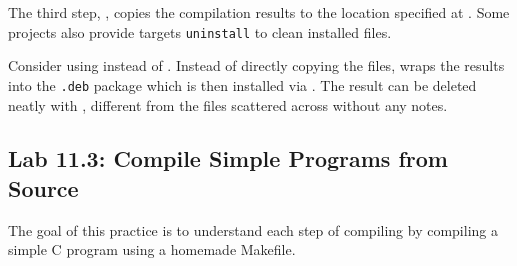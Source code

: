 The third step, , copies the compilation results to the location specified at . Some projects also provide targets
\texttt{uninstall} to clean installed files.

\begin{tipbox}
Consider using  instead of . Instead of directly copying the files,  wraps the results into the \texttt{.deb} package which is then installed via . The result can be deleted neatly with , different from the files scattered across
 without any notes.
\end{tipbox}

\subsection*{Lab 11.3: Compile Simple Programs from Source}

The goal of this practice is to understand each step of compiling  by compiling a simple C program using a homemade Makefile.

